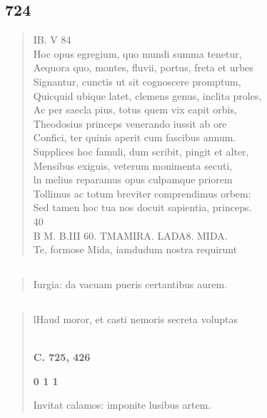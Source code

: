 \documentclass[11pt, a4paper]{report}
\begin{document}
            \subsection*{724}
      \begin{verse}
      IB. V 84 \\ Hoc opus egregium, quo mundi summa tenetur, \\ Aequora quo, montes, fluvii, portus, freta et urbes \\ Signantur, cunctis ut sit cognoscere promptum, \\ Quicquid ubique latet, clemens genus, inclita proles, \\ Ac per saecla pius, totus quem vix capit orbis, \\ Theodosius princeps venerando iussit ab ore \\ Confici, ter quinis aperit cum fascibus annum. \\ Supplices hoc famuli, dum scribit, pingit et alter, \\ Mensibus exiguis, veterum monimenta secuti, \\ ln melius reparamus opus culpamque priorem \\ Tollimus ac totum breviter comprendimus orbem: \\ Sed tamen hoc tua nos docuit sapientia, princeps. \\ 40 \\ B M. B.III 60. TMAMIRA. LADA8. MIDA. \\ Te, formose Mida, iamdudum nostra requirunt \\ 
      \end{verse}
  
            \subsection*{}
      \begin{verse}
      Iurgia: da vacuam pueris certantibus aurem. \\ 
      \end{verse}
  
            \subsection*{}
      \begin{verse}
      lHaud moror, et casti nemoris secreta voluptas \\ 
        ﻿\pagebreak 
    \begin{center} \textbf{C. 725, 426} \end{center}\begin{center} \textbf{0 1 1} \end{center}Invitat calamos: imponite lusibus artem. \\ 
      \end{verse}
  
\end{document}
